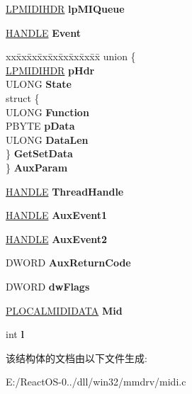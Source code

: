 \begin{DoxyCompactItemize}
\hyperlink{structmidihdr__tag}{L\+P\+M\+I\+D\+I\+H\+DR} {\bfseries lp\+M\+I\+Queue}
\item 
\mbox{\label{structtag___m_i_d_i_a_l_l_o_c_ab089c4e5eed4ce6b6ebe6ccb4198d8a5}} 
\hyperlink{interfacevoid}{H\+A\+N\+D\+LE} {\bfseries Event}
\item 
\mbox{\label{structtag___m_i_d_i_a_l_l_o_c_a005eb4ec2241b9997a268c4bc8d0027f}} 
\begin{tabbing}
xx\=xx\=xx\=xx\=xx\=xx\=xx\=xx\=xx\=\kill
union \{\\
\>\hyperlink{structmidihdr__tag}{LPMIDIHDR} {\bfseries pHdr}\\
\>ULONG {\bfseries State}\\
\>struct \{\\
\>\>ULONG {\bfseries Function}\\
\>\>PBYTE {\bfseries pData}\\
\>\>ULONG {\bfseries DataLen}\\
\>\} {\bfseries GetSetData}\\
\} {\bfseries AuxParam}\\

\end{tabbing}\item 
\mbox{\label{structtag___m_i_d_i_a_l_l_o_c_a0f891ae8d2b684dea04a4b3c5a60b145}} 
\hyperlink{interfacevoid}{H\+A\+N\+D\+LE} {\bfseries Thread\+Handle}
\item 
\mbox{\label{structtag___m_i_d_i_a_l_l_o_c_ab78ee0b8ff595db6646ece2a5f6d1513}} 
\hyperlink{interfacevoid}{H\+A\+N\+D\+LE} {\bfseries Aux\+Event1}
\item 
\mbox{\label{structtag___m_i_d_i_a_l_l_o_c_a458a0211fd88cded5306b76e0c824b8a}} 
\hyperlink{interfacevoid}{H\+A\+N\+D\+LE} {\bfseries Aux\+Event2}
\item 
\mbox{\label{structtag___m_i_d_i_a_l_l_o_c_a46a0cb032e59765f719b60ecd5e55810}} 
D\+W\+O\+RD {\bfseries Aux\+Return\+Code}
\item 
\mbox{\label{structtag___m_i_d_i_a_l_l_o_c_ad5dca01660a4cc2f5e8fd6641acc5b49}} 
D\+W\+O\+RD {\bfseries dw\+Flags}
\item 
\mbox{\label{structtag___m_i_d_i_a_l_l_o_c_a1a8d3783dab25bfce13b4b6ff4fecdea}} 
\hyperlink{struct_l_o_c_a_l_m_i_d_i_d_a_t_a}{P\+L\+O\+C\+A\+L\+M\+I\+D\+I\+D\+A\+TA} {\bfseries Mid}
\item 
\mbox{\label{structtag___m_i_d_i_a_l_l_o_c_a6e2982fd84b2bed1309cad649afdcc07}} 
int {\bfseries l}
\end{DoxyCompactItemize}


该结构体的文档由以下文件生成\+:\begin{DoxyCompactItemize}
\item 
E\+:/\+React\+O\+S-\/0../dll/win32/mmdrv/midi.\+c\end{DoxyCompactItemize}
